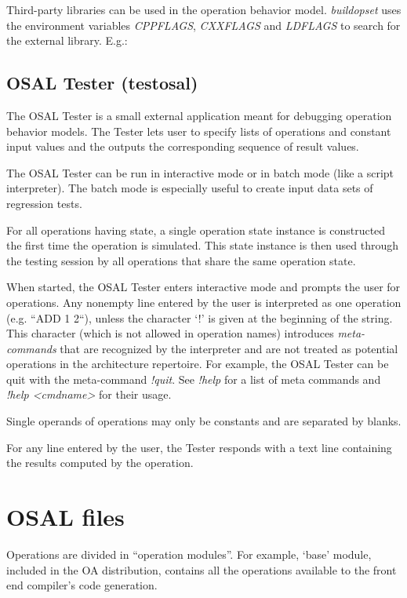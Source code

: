 \documentclass[a4paper,twoside]{tceusermanual}
\begin{document}
Third-party libraries can be used in the operation behavior model.
\emph{buildopset} uses the environment variables \emph{CPPFLAGS}, 
\emph{CXXFLAGS} and \emph{LDFLAGS} to search for the external library. E.g.: 



\subsection{OSAL Tester (testosal)}
\label{sec:testosal}

The OSAL Tester is a small external application meant for debugging 
operation behavior models.  The Tester lets user to specify lists of
operations and constant input values and the outputs the corresponding sequence
of result values.

The OSAL Tester can be run in interactive mode or in batch mode (like a
script interpreter).  The batch mode is especially useful to create input
data sets of regression tests.

For all operations having state, a single operation state instance is
constructed the first time the operation is simulated. This state instance
is then used through the testing session by all operations that share the
same operation state.

When started, the OSAL Tester enters interactive mode and prompts the user
for operations. Any nonempty line entered by the user is interpreted as one
operation (e.g. ``ADD 1 2``), unless the character `!' is given at the beginning of 
the string. This character (which is not allowed in operation names) introduces
\emph{meta-commands} that are recognized by the interpreter and are not
treated as potential operations in the architecture repertoire. For example, the
OSAL Tester can be quit with the meta-command \textit{!quit}. See \textit{!help}
for a list of meta commands and \textit{!help <cmdname>} for their usage.

Single operands of operations may only be constants and are separated by
blanks.

For any line entered by the user, the Tester responds with a text line
containing the results computed by the operation.


\section{OSAL files}
\label{section:osal_details}
Operations are divided in ``operation modules''. For example, `base' module,
included in the OA distribution, contains all the operations available 
to the front end compiler's code generation.
\end{document}
